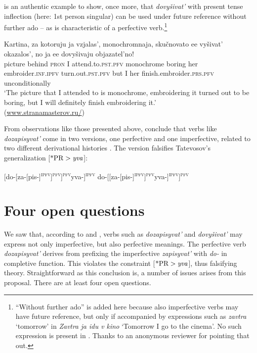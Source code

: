 \documentclass[output=paper,
colorlinks,
citecolor=brown,
newtxmath
]{langscibook}
\begin{document}
\noindent {} is an authentic example to show, once more, that \textit{dovyšivat'} with present tense inflection (here: 1st person singular) can be used under future reference without further ado -- as is characteristic of a perfective verb.\footnote{``Without further ado'' is added here because also imperfective verbs may have future reference, but only if accompanied by expressions such as \textit{zavtra} `tomorrow' in \textit{Zavtra ja idu v kino} `Tomorrow I go to the cinema'. No such expression is present in . Thanks to an anonymous reviewer for pointing that out.}

\ea\label{mono}
\gll Kartina, za kotoruju ja vzjalas', monochromnaja, skučnovato ee vyšivat' okazalos', no ja ee dovyšivaju objazatel'no! \\
picture behind \textsc{pron} I {attend.to.}\textsc{pst.pfv} monochrome
boring her embroider.\textsc{inf.ipfv} {turn.out.}\textsc{pst.pfv}
but I her {finish.embroider.}\textsc{prs.pfv} unconditionally\\
\trans `The picture that I attended to is monochrome, embroidering it turned out to be boring, but I will definitely finish embroidering it.'\\ \hfill (\url{www.stranamasterov.ru/})
\z

\noindent From observations like those presented above, \citet{Zinova.Filip2015} conclude that verbs like \textit{dozapisyvat'} come in two versions, one perfective and one imperfective, related to two different derivational histories . The version  falsifies Tatevosov's generalization [$\text{*PR}>\text{\textit{yva}}$]:

\ea\label{2hist}
\ea {[}[do-[za-[pis-]\textsuperscript{\textsc{ipfv}}]\textsuperscript{\textsc{pfv}}]\textsuperscript{\textsc{pfv}}yva-]\textsuperscript{\textsc{ipfv}} \label{2hista}
\ex {[}do-[[za-[pis-]\textsuperscript{\textsc{ipfv}}]\textsuperscript{\textsc{pfv}}yva-]\textsuperscript{\textsc{ipfv}}]\textsuperscript{\textsc{pfv}} \label{2histb}
\z\z


\section{Four open questions}\label{H1}

We saw that, according to \citet{Zinova.Filip2015} and \citet{Zinova2016}, verbs such as \textit{dozapisyvat'} and \textit{dovyšivat'} may express not only imperfective, but also perfective meanings. The perfective verb \textit{dozapisyvat'} derives from prefixing the imperfective \textit{zapisyvat'} with \textit{do-} in completive function. This violates the constraint [$\text{*PR}>\text{\textit{yva}}$], thus falsifying  theory. Straightforward as this conclusion is, a number of issues arises from this proposal. There are at least four open questions.
\end{document}

